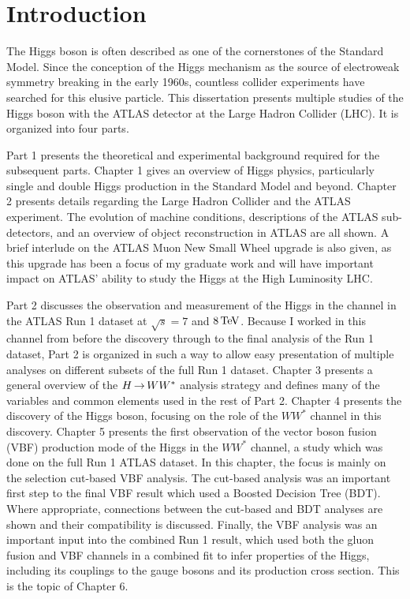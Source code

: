\chapter{Introduction}
\label{introduction}

The Higgs boson is often described as one of the cornerstones of the Standard Model. Since the conception of the Higgs mechanism as the source of electroweak symmetry breaking in the early 1960s, countless collider experiments have searched for this elusive particle. This dissertation presents multiple studies of the Higgs boson with the ATLAS detector at the Large Hadron Collider (LHC). It is organized into four parts. 

Part 1 presents the theoretical and experimental background required for the subsequent parts. Chapter 1 gives an overview of Higgs physics, particularly single and double Higgs production in the Standard Model and beyond. Chapter 2 presents details regarding the Large Hadron Collider and the ATLAS experiment. The evolution of machine conditions, descriptions of the ATLAS sub-detectors, and an overview of object reconstruction in ATLAS are all shown. A brief interlude on the ATLAS Muon New Small Wheel upgrade is also given, as this upgrade has been a focus of my graduate work and will have important impact on ATLAS' ability to study the Higgs at the High Luminosity LHC. 

Part 2 discusses the observation and measurement of the Higgs in the \HWWfull channel in the ATLAS Run 1 dataset at $\sqrt{s} = 7$ and $8 \TeV$. Because I worked in this channel from before the discovery through to the final analysis of the Run 1 dataset, Part 2 is organized in such a way to allow easy presentation of multiple analyses on different subsets of the full Run 1 dataset. Chapter 3 presents a general overview of the $H{\,{\rightarrow}\,}WW^\ast$ analysis strategy and defines many of the variables and common elements used in the rest of Part 2. Chapter 4 presents the discovery of the Higgs boson, focusing on the role of the $WW^*$ channel in this discovery. Chapter 5 presents the first observation of the vector boson fusion (VBF) production mode of the Higgs in the $WW^*$ channel, a study which was done on the full Run 1 ATLAS dataset. In this chapter, the focus is mainly on the selection cut-based VBF analysis. The cut-based analysis was an important first step to the final VBF result which used a Boosted Decision Tree (BDT). Where appropriate, connections between the cut-based and BDT analyses are shown and their compatibility is discussed. Finally, the VBF analysis was an important input into the combined Run 1 \HWWfull result, which used both the gluon fusion and VBF channels in a combined fit to infer properties of the Higgs, including its couplings to the gauge bosons and its production cross section. This is the topic of Chapter 6. 

